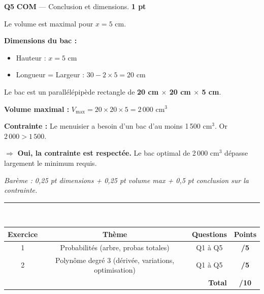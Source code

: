 \documentclass[a4paper,11pt]{article}
\newcommand{\pts}[1]{\hfill\textcolor{gris}{\small\textbf{#1}}}
\newcommand{\comp}[1]{\colorbox{blue!10}{\scriptsize\textbf{#1}}}
\begin{document}
\textbf{Q5} \comp{COM} — Conclusion et dimensions. \pts{1 pt}

\begin{corrbox}
Le volume est maximal pour $\boxed{x = 5 \text{ cm}}$.

\textbf{Dimensions du bac :}
\begin{itemize}[nosep]
  \item Hauteur : $x = 5$ cm
  \item Longueur = Largeur : $30 - 2 \times 5 = 20$ cm
\end{itemize}

Le bac est un parallélépipède rectangle de \textbf{20 cm $\times$ 20 cm $\times$ 5 cm}.

\textbf{Volume maximal :} $V_{\max} = 20 \times 20 \times 5 = \boxed{2\,000 \text{ cm}^3}$

\textbf{Contrainte :} Le menuisier a besoin d'un bac d'au moins 1\,500 cm$^3$. Or $2\,000 > 1\,500$.

$\Rightarrow$ \textbf{Oui, la contrainte est respectée.} Le bac optimal de 2\,000 cm$^3$ dépasse largement le minimum requis.

\smallskip
\textit{Barème : 0,25 pt dimensions + 0,25 pt volume max + 0,5 pt conclusion sur la contrainte.}
\end{corrbox}

\vfill

\begin{center}
\textcolor{rouge}{\rule{12cm}{1pt}}\\[8pt]
\begin{tabular}{|c|c|c|c|}
\hline
\textbf{Exercice} & \textbf{Thème} & \textbf{Questions} & \textbf{Points} \\
\hline
1 & Probabilités (arbre, probas totales) & Q1 à Q5 & \textbf{/5} \\
\hline
2 & Polynôme degré 3 (dérivée, variations, optimisation) & Q1 à Q5 & \textbf{/5} \\
\hline
\multicolumn{3}{|r|}{\textbf{Total}} & \textbf{/10} \\
\hline
\end{tabular}
\end{center}
\end{document}
